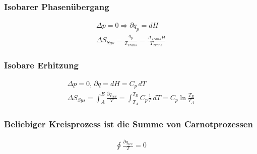 \documentclass[a4paper, fleqn]{article}
\begin{document}
\subsubsection{Isobarer Phasenübergang}
\begin{eqnarray*}
    \Delta p = 0 \Rightarrow \partial q_p = dH\\
    \Delta S_{Sys} = \frac{q_p}{T_{Trans}}=\frac{\Delta_{Trans} H}{T_{Trans}}
\end{eqnarray*}

\subsubsection{Isobare Erhitzung}
\begin{eqnarray*}
    \Delta p = 0,\,\partial q = dH = C_p\,dT\\
    \Delta S_{Sys} = \int_{A}^{E}  \frac{\partial q_{rev}}{T} = \int_{T_A}^{T_E} C_p \frac{1}{T}\,dT = C_p\ln\frac{T_E}{T_A}
\end{eqnarray*}

\subsubsection{Beliebiger Kreisprozess ist die Summe von Carnotprozessen}
\begin{eqnarray*}
    \oint \frac{\partial q_{rev}}{T}=0\\
\end{eqnarray*}
\end{document}

